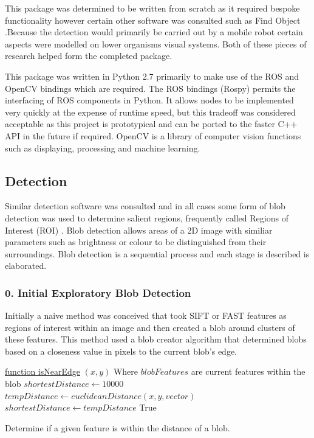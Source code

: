 \documentclass{mproj}
\begin{document}
This package was determined to be written from scratch as it required bespoke functionality however certain other software was consulted such as Find Object \cite{find}.Because the detection would primarily be carried out by a mobile robot certain aspects were modelled on lower organisms visual systems. Both of these pieces of research helped form the completed package.

This package was written in Python 2.7 primarily to make use of the ROS and OpenCV bindings which are required. The ROS bindings (Rospy) permits the interfacing of ROS components in Python. It allows nodes to be implemented very quickly at the expense of runtime speed, but this tradeoff was considered acceptable as this project is prototypical and can be ported to the faster C++ API in the future if required. OpenCV is a library of computer vision functions such as displaying, processing and machine learning.


\subsection{Detection}

Similar detection software was consulted and in all cases some form of blob detection was used to determine salient regions, frequently called Regions of Interest (ROI) \cite{HosangBS14}. Blob detection allows areas of a 2D image with similiar parameters such as brightness or colour to be distinguished from their surroundings. Blob detection is a sequential process and each stage is described is elaborated.

\subsubsection{0. Initial Exploratory Blob Detection}

Initially a naive method was conceived that took SIFT or FAST features as regions of interest within an image and then created a blob around clusters of these features. This method used a blob creator algorithm that determined blobs based on a closeness value in pixels to the current blob's edge.

 \begin{algorithm}

    \underline{function isNearEdge} $(x,y)$\;
    Where $blobFeatures$ are current features within the blob\;
    $shortestDistance \leftarrow 10000 $\;
    {
    $tempDistance \leftarrow euclideanDistance( x,y,vector ) $\;
    {
    	$shortestDistance \leftarrow tempDistance$
    }
    }
    { 
    	\Return True
    }

    
    \caption{Determine if a given feature is within the distance of a blob.  }
\end{algorithm}
\end{document}

